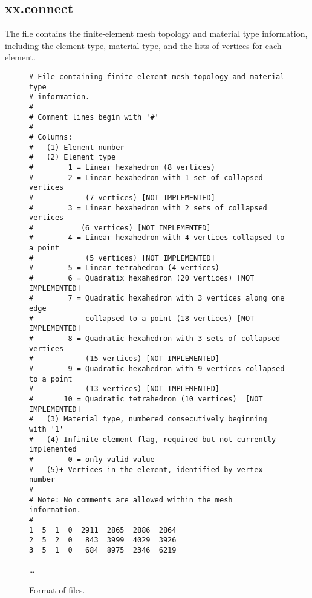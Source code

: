 \subsection{xx.connect}

The  file contains the finite-element mesh
topology and material type information, including the element type,
material type, and the lists of vertices for each element.

\begin{figure}
  \begin{center}
\begin{verbatim}
# File containing finite-element mesh topology and material type
# information.
#
# Comment lines begin with '#'
#
# Columns:
#   (1) Element number
#   (2) Element type
#        1 = Linear hexahedron (8 vertices)
#        2 = Linear hexahedron with 1 set of collapsed vertices
#            (7 vertices) [NOT IMPLEMENTED]
#        3 = Linear hexahedron with 2 sets of collapsed vertices
#           (6 vertices) [NOT IMPLEMENTED]
#        4 = Linear hexahedron with 4 vertices collapsed to a point
#            (5 vertices) [NOT IMPLEMENTED]
#        5 = Linear tetrahedron (4 vertices)
#        6 = Quadratix hexahedron (20 vertices) [NOT IMPLEMENTED]
#        7 = Quadratic hexahedron with 3 vertices along one edge 
#            collapsed to a point (18 vertices) [NOT IMPLEMENTED]
#        8 = Quadratic hexahedron with 3 sets of collapsed vertices
#            (15 vertices) [NOT IMPLEMENTED]
#        9 = Quadratic hexahedron with 9 vertices collapsed to a point
#            (13 vertices) [NOT IMPLEMENTED]
#       10 = Quadratic tetrahedron (10 vertices)  [NOT IMPLEMENTED]
#   (3) Material type, numbered consecutively beginning with '1'
#   (4) Infinite element flag, required but not currently implemented
#        0 = only valid value
#   (5)+ Vertices in the element, identified by vertex number
#
# Note: No comments are allowed within the mesh information.
#
1  5  1  0  2911  2865  2886  2864
2  5  2  0   843  3999  4029  3926
3  5  1  0   684  8975  2346  6219
\end{verbatim}
    \ldots
    \caption{Format of  files.}
  \end{center}
\end{figure}  
